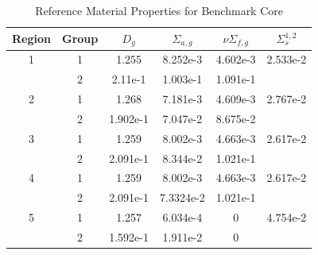 \documentclass{mc2015}
\begin{document}
\begin{table}[h]
\centering
\begin{tabular}{c c | c c c c}
Region & Group & $D_g$ & $\Sigma_{a,g}$ & $\nu\Sigma_{f,g}$ & $\Sigma_s^{1,2}$ \\ \hline
1 & 1 & 1.255 & 8.252e-3 & 4.602e-3 & 2.533e-2 \\
 & 2 & 2.11e-1 & 1.003e-1 & 1.091e-1 & \\ \hline
2 & 1 & 1.268 & 7.181e-3 & 4.609e-3 & 2.767e-2 \\
 & 2 & 1.902e-1 & 7.047e-2 & 8.675e-2 & \\ \hline
3 & 1 & 1.259 & 8.002e-3 & 4.663e-3 & 2.617e-2 \\
 & 2 & 2.091e-1 & 8.344e-2 & 1.021e-1 & \\ \hline
4 & 1 & 1.259 & 8.002e-3 & 4.663e-3 & 2.617e-2 \\
 & 2 & 2.091e-1 & 7.3324e-2 & 1.021e-1 & \\ \hline
5 & 1 & 1.257 & 6.034e-4 & 0 & 4.754e-2 \\
 & 2 & 1.592e-1 & 1.911e-2 & 0 & 
\end{tabular}
\caption{Reference Material Properties for Benchmark Core}
\label{tab:coremats}
\end{table}
\end{document}
